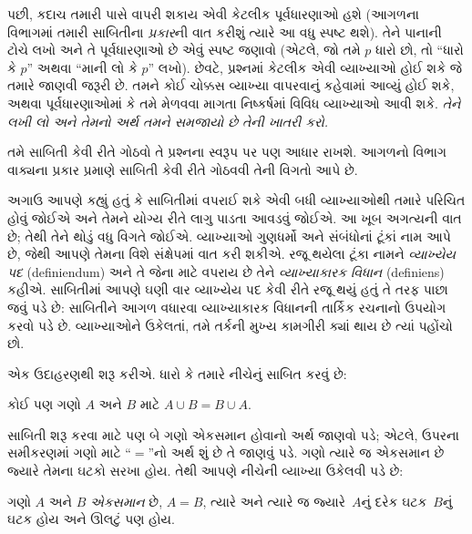 પછી, કદાચ તમારી પાસે વાપરી શકાય એવી કેટલીક પૂર્વધારણાઓ હશે
(આગળના વિભાગમાં તમારી સાબિતીના \emph{પ્રકાર}ની વાત કરીશું ત્યારે
આ વધુ સ્પષ્ટ થશે). તેને પાનાની ટોચે લખો અને તે પૂર્વધારણાઓ છે
એવું સ્પષ્ટ જણાવો (એટલે, જો તમે $p$ ધારો છો, તો ``ધારો કે $p$''
અથવા ``માની લો કે $p$'' લખો). છેવટે, પ્રશ્નમાં કેટલીક એવી
વ્યાખ્યાઓ હોઈ શકે જે તમારે જાણવી જરૂરી છે. તમને કોઈ ચોક્કસ
વ્યાખ્યા વાપરવાનું કહેવામાં આવ્યું હોઈ શકે, અથવા પૂર્વધારણાઓમાં
કે તમે મેળવવા માગતા નિષ્કર્ષમાં વિવિધ વ્યાખ્યાઓ આવી શકે.
\emph{તેને લખી લો અને તેમનો અર્થ તમને સમજાયો છે તેની ખાતરી કરો.}

તમે સાબિતી કેવી રીતે ગોઠવો તે પ્રશ્નના સ્વરૂપ પર પણ આધાર રાખશે.
આગળનો વિભાગ વાક્યના પ્રકાર પ્રમાણે સાબિતી કેવી રીતે ગોઠવવી તેની
વિગતો આપે છે.
\endgroup


\begingroup
\makeatletter{}\makeatother


\label{guunit:OLP-0605}


અગાઉ આપણે કહ્યું હતું કે સાબિતીમાં વપરાઈ શકે એવી બધી વ્યાખ્યાઓથી
તમારે પરિચિત હોવું જોઈએ અને તેમને યોગ્ય રીતે લાગુ પાડતા આવડવું
જોઈએ. આ ખૂબ અગત્યની વાત છે; તેથી તેને થોડું વધુ વિગતે જોઈએ.
વ્યાખ્યાઓ ગુણધર્મો અને સંબંધોનાં ટૂંકાં નામ આપે છે, જેથી આપણે
તેમના વિશે સંક્ષેપમાં વાત કરી શકીએ. રજૂ થયેલા ટૂંકા નામને
\emph{વ્યાખ્યેય પદ} (definiendum) અને તે જેના માટે વપરાય છે તેને
\emph{વ્યાખ્યાકારક વિધાન} (definiens) કહીએ. સાબિતીમાં આપણે ઘણી વાર
વ્યાખ્યેય પદ કેવી રીતે રજૂ થયું હતું તે તરફ પાછા જવું પડે છે:
સાબિતીને આગળ વધારવા વ્યાખ્યાકારક વિધાનની તાર્કિક રચનાનો ઉપયોગ
કરવો પડે છે. વ્યાખ્યાઓને ઉકેલતાં, તમે તર્કની મુખ્ય કામગીરી ક્યાં
થાય છે ત્યાં પહોંચો છો.

એક ઉદાહરણથી શરૂ કરીએ. ધારો કે તમારે નીચેનું સાબિત કરવું છે:

\begin{prop}
કોઈ પણ ગણો $A$ અને $B$ માટે $A \cup B = B \cup A$.
\end{prop}

સાબિતી શરૂ કરવા માટે પણ બે ગણો એકસમાન હોવાનો અર્થ જાણવો પડે;
એટલે, ઉપરના સમીકરણમાં ગણો માટે ``$=$''નો અર્થ શું છે તે જાણવું પડે.
ગણો ત્યારે જ એકસમાન છે જ્યારે તેમના ઘટકો સરખા હોય.
તેથી આપણે નીચેની વ્યાખ્યા ઉકેલવી પડે છે:

\begin{defn}
ગણો $A$ અને $B$ \emph{એકસમાન} છે, $A = B$, ત્યારે અને ત્યારે જ
જ્યારે~$A$નું દરેક ઘટક~$B$નું ઘટક હોય અને ઊલટું પણ હોય.
\end{defn}

